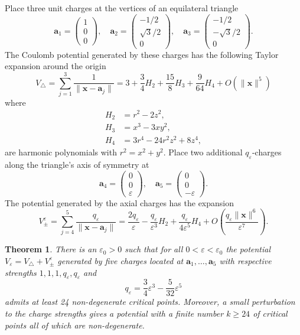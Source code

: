 \documentclass[12pt,a4paper]{article}
\theoremstyle{plain}
\newtheorem{thm}{Theorem}%
\theoremstyle{definition}
\begin{document}
	Place three unit charges at the vertices of an equilateral triangle
	\[
	\mathbf{a}_1=\begin{pmatrix}
		1\\ 0\\0
	\end{pmatrix},
	\quad
	\mathbf{a}_2=\begin{pmatrix}
		-1/2\\ \sqrt{3}/2 \\0
	\end{pmatrix},
	\quad
	\mathbf{a}_3=\begin{pmatrix}
		-1/2 \\-\sqrt{3}/2 \\0
	\end{pmatrix}.
	\]
	The Coulomb potential generated by these charges has the following Taylor expansion around the origin
	\[
	V_\triangle=\sum_{j=1}^3\frac{1}{\|\mathbf{x}-\mathbf{a}_j\|}=3+\frac{3}{4}H_2+\frac{15}{8}H_3+\frac{9}{64}H_4+O(\|\mathbf{x}\|^5)
	\]
	where 
	\begin{align*}
		H_2&=r^2-2z^2,\\
		H_3&=x^3-3xy^2,\\
		H_4&=3r^4-24r^2z^2+8z^4,
	\end{align*}
	are harmonic polynomials with \(r^2=x^2+y^2\). Place two additional \(q_\varepsilon\)-charges along the triangle's axis of symmetry at
	\[
	\mathbf{a}_4=\begin{pmatrix}
		0\\0\\\varepsilon
	\end{pmatrix},\quad
	\mathbf{a}_5=\begin{pmatrix}
		0\\0\\-\varepsilon
	\end{pmatrix}.
	\]
	The potential generated by the axial charges has the expansion
	\[
	V_\pm^\varepsilon=\sum_{j=4}^5\frac{q_\varepsilon}{\|\mathbf{x}-\mathbf{a}_j\|}=\frac{2q_\varepsilon}{\varepsilon}-\frac{q_\varepsilon}{\varepsilon^3}H_2+\frac{q_\varepsilon}{4\varepsilon^5}H_4+O\left(\frac{q_\varepsilon\|\mathbf{x}\|^6}{\varepsilon^7}\right).
	\]
	
	
	\begin{thm}\label{thm:maintheorem}
		There is an \(\varepsilon_0>0\) such that for all \(0<\varepsilon<\varepsilon_0\) the potential \(V_\varepsilon=V_\triangle+V^\varepsilon_\pm\) generated by five charges located at \(\mathbf{a}_1,\dots,\mathbf{a}_5\) with respective strengths \(1,1,1,q_\varepsilon,q_\varepsilon\) and
		\begin{equation}\label{qe}
			q_\varepsilon=\frac{3}{4} \varepsilon^3 - \frac{5}{32} \varepsilon^5
		\end{equation}
		admits at least 24 non-degenerate critical points. Moreover, a small perturbation to the charge strengths gives a potential with a finite number \(k\ge 24\) of critical points all of which are non-degenerate.
	\end{thm}
	
\end{document}
